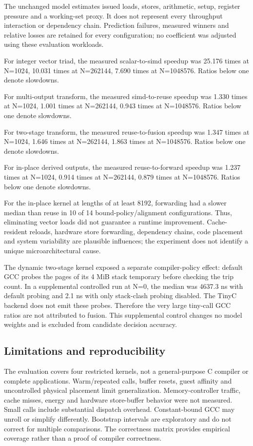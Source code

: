 The unchanged model estimates issued loads, stores, arithmetic, setup, register pressure and a working-set proxy. It does not represent every throughput interaction or dependency chain. Prediction failures, measured winners and relative losses are retained for every configuration; no coefficient was adjusted using these evaluation workloads.

For integer vector triad, the measured scalar-to-simd speedup was 25.176 times at N=1024, 10.031 times at N=262144, 7.690 times at N=1048576. Ratios below one denote slowdowns.

For multi-output transform, the measured simd-to-reuse speedup was 1.330 times at N=1024, 1.001 times at N=262144, 0.943 times at N=1048576. Ratios below one denote slowdowns.

For two-stage transform, the measured reuse-to-fusion speedup was 1.347 times at N=1024, 1.646 times at N=262144, 1.863 times at N=1048576. Ratios below one denote slowdowns.

For in-place derived outputs, the measured reuse-to-forward speedup was 1.237 times at N=1024, 0.914 times at N=262144, 0.879 times at N=1048576. Ratios below one denote slowdowns.

For the in-place kernel at lengths of at least 8192, forwarding had a slower median than reuse in 10 of 14 bound-policy/alignment configurations. Thus, eliminating vector loads did not guarantee a runtime improvement. Cache-resident reloads, hardware store forwarding, dependency chains, code placement and system variability are plausible influences; the experiment does not identify a unique microarchitectural cause.

The dynamic two-stage kernel exposed a separate compiler-policy effect: default GCC probes the pages of its 4 MiB stack temporary before checking the trip count. In a supplemental controlled run at N=0, the median was 4637.3 ns with default probing and 2.1 ns with only stack-clash probing disabled. The TinyC backend does not emit these probes. Therefore the very large tiny-call GCC ratios are not attributed to fusion. This supplemental control changes no model weights and is excluded from candidate decision accuracy.

\subsection{Limitations and reproducibility}

The evaluation covers four restricted kernels, not a general-purpose C compiler or complete applications. Warm/repeated calls, buffer resets, guest affinity and uncontrolled physical placement limit generalization. Memory-controller traffic, cache misses, energy and hardware store-buffer behavior were not measured. Small calls include substantial dispatch overhead. Constant-bound GCC may unroll or simplify differently. Bootstrap intervals are exploratory and do not correct for multiple comparisons. The correctness matrix provides empirical coverage rather than a proof of compiler correctness.

